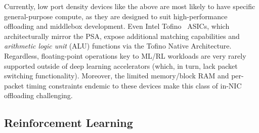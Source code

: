\documentclass[
sigconf,natbib=false
]{acmart}
\newcounter{insightc}
\newenvironment{insight}
	{
		\begin{tipblock}\refstepcounter{insightc}\textbf{Insight \theinsightc:}\em
	}
	{
		\end{tipblock}
	}
\begin{document}
Currently, low port density devices like the above are most likely to have specific general-purpose compute, as they are designed to suit high-performance offloading and middlebox development.
Even Intel Tofino~\parencite{barefoot-intel} ASICs, which architecturally mirror the PSA, expose additional matching capabilities and \emph{arithmetic logic unit} (ALU) functions via the Tofino Native Architecture.
Regardless, floating-point operations key to ML/RL workloads are very rarely supported outside of deep learning accelerators (which, in turn, lack packet switching functionality).
Moreover, the limited memory/block RAM and per-packet timing constraints endemic to these devices make this class of in-NIC offloading challenging.


\subsection{Reinforcement Learning}
%
\end{document}
